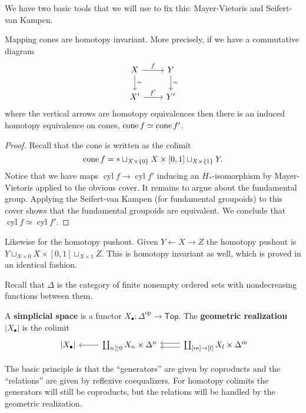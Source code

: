 \documentclass{amsart}
\DeclareMathOperator{\cyl}{cyl}
\begin{document}
We have two basic tools that we will use to fix this: Mayer-Vietoris and Seifert-van Kampen.
\begin{lemma}
    Mapping cones are homotopy invariant. More precisely, if we have a commutative diagram
    \begin{equation*}
        \begin{tikzcd}
            X \rar{f}\dar{\sim} & Y\dar{\sim}\\
            X' \rar{f'} & Y'
        \end{tikzcd}
    \end{equation*}
    where the vertical arrows are homotopy equivalences then there is an
    induced homotopy equivalence on cones, $\operatorname{cone} f\simeq \operatorname{cone} f'$.
\end{lemma}
\begin{proof}
    Recall that the cone is written as the colimit
    \begin{equation*}
        \operatorname{cone} f = *\sqcup_{X\times\{0\}}X\times[0,1]\sqcup_{X\times\{1\}}Y.
    \end{equation*}
    Notice that we have maps $\cyl f \to \cyl f'$ inducing an $H_*$-isomorphism
    by Mayer-Vietoris applied to the obvious cover. It remains to argue about the
    fundamental group. Applying the Seifert-van Kampen (for fundamental groupoids)
    to this cover shows that the fundamental groupoids are equivalent. We conclude
    that $\cyl f \simeq \cyl f'$.
\end{proof}
Likewise for the homotopy pushout. Given $Y \xleftarrow{}X\xrightarrow{} Z$ the
homotopy pushout is $Y\sqcup_{X\times 0}X\times[0,1]\sqcup_{X\times 1}Z$. This is
homotopy invariant as well, which is proved in an identical fashion.

Recall that $\Delta$ is the category of finite nonempty ordered sets with
nondecreasing functions between them.
\begin{definition}
    A \textbf{simplicial space} is a functor $X_\bullet:\Delta^\text{op}\to \mathsf{Top}$.
    The \textbf{geometric realization} $|X_\bullet|$ is the colimit
    \begin{equation*}
        \begin{tikzcd}
            \;|X_\bullet|& \coprod_{n\geq 0}X_n\times \Delta^n\lar & \coprod_{[m]\to[l]}X_l\times \Delta^m \ar[l, shift left]\ar[l, shift right] %
        \end{tikzcd}
    \end{equation*}
\end{definition}
The basic principle is that the ``generators'' are given by coproducts and the ``relations''
are given by reflexive coequalizers. For homotopy colimits the generators will still be
coproducts, but the relations will be handled by the geometric realization.
\end{document}
